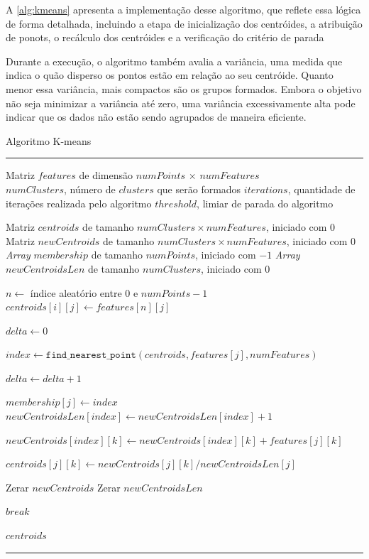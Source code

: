 A \autoref{alg:kmeans} apresenta a implementação desse algoritmo, que reflete essa lógica de forma detalhada, incluindo a etapa de inicialização dos centróides, a atribuição de ponots, o recálculo dos centróides e a verificação do critério de parada

Durante a execução, o algoritmo também avalia a variância, uma medida que indica o quão disperso os pontos estão em relação ao seu centróide. Quanto menor essa variância, mais compactos são os grupos formados. Embora o objetivo não seja minimizar a variância até zero, uma variância excessivamente alta pode indicar que os dados não estão sendo agrupados de maneira eficiente.

\begin{algorithm}[htb!]
	\caption{Algoritmo K-means}
	\label{alg:kmeans}
	\hrule
	\begin{algorithmic}[1]
		\REQUIRE Matriz $features$ de dimensão $numPoints$ $\times$ $numFeatures$ \\
		\REQUIRE $numClusters$, número de $clusters$ que serão formados
		\REQUIRE $iterations$, quantidade de iterações realizada pelo algoritmo
		\REQUIRE $threshold$, limiar de parada do algoritmo

		\STATE Matriz $centroids$ de tamanho $numClusters \times numFeatures$, iniciado com $0$
		\STATE Matriz $newCentroids$ de tamanho $numClusters \times numFeatures$, iniciado com $0$
		\STATE \textit{Array} $membership$ de tamanho $numPoints$, iniciado com $-1$
		\STATE \textit{Array} $newCentroidsLen$ de tamanho $numClusters$, iniciado com $0$

		\STATE $n \gets$ índice aleatório entre $0$ e $numPoints - 1$
		\STATE $\textit{centroids}[i][j] \gets \textit{features}[n][j]$
		\ENDFOR
		\ENDFOR

		\STATE $\textit{delta} \gets 0$

		\STATE $index \gets \texttt{find\_nearest\_point}(centroids, features[j], numFeatures)$

		\STATE $delta \gets delta + 1$
		\ENDIF

		\STATE $membership[j] \gets index$
		\STATE $newCentroidsLen[index] \gets newCentroidsLen[index] + 1$

		\STATE $newCentroids[index][k] \gets newCentroids[index][k] + features[j][k]$
		\ENDFOR
		\ENDFOR

		\STATE $centroids[j][k] \gets newCentroids[j][k] / newCentroidsLen[j]$
		\ENDFOR
		\ENDIF
		\ENDFOR

		\STATE Zerar $newCentroids$
		\STATE Zerar $newCentroidsLen$

		\STATE $break$
		\ENDIF
		\ENDFOR

		\RETURN  $centroids$

	\end{algorithmic}
	\hrule
	\fonte{}
\end{algorithm}

